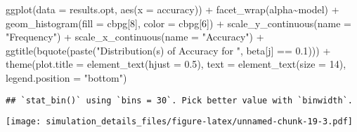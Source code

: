 \documentclass[
]{article}
\newenvironment{Shaded}{\begin{snugshade}}{\end{snugshade}}
\newcommand{\AttributeTok}[1]{\textcolor[rgb]{0.77,0.63,0.00}{#1}}
\newcommand{\DecValTok}[1]{\textcolor[rgb]{0.00,0.00,0.81}{#1}}
\newcommand{\FloatTok}[1]{\textcolor[rgb]{0.00,0.00,0.81}{#1}}
\newcommand{\FunctionTok}[1]{\textcolor[rgb]{0.00,0.00,0.00}{#1}}
\newcommand{\NormalTok}[1]{#1}
\newcommand{\SpecialCharTok}[1]{\textcolor[rgb]{0.00,0.00,0.00}{#1}}
\newcommand{\StringTok}[1]{\textcolor[rgb]{0.31,0.60,0.02}{#1}}
\begin{document}
\begin{Shaded}
\begin{Highlighting}[]
\FunctionTok{ggplot}\NormalTok{(}\AttributeTok{data =}\NormalTok{ results.opt,}
       \FunctionTok{aes}\NormalTok{(}\AttributeTok{x =}\NormalTok{ accuracy)) }\SpecialCharTok{+}
  \FunctionTok{facet\_wrap}\NormalTok{(alpha}\SpecialCharTok{\textasciitilde{}}\NormalTok{model) }\SpecialCharTok{+}
  \FunctionTok{geom\_histogram}\NormalTok{(}\AttributeTok{fill =}\NormalTok{ cbpg[}\DecValTok{8}\NormalTok{], }\AttributeTok{color =}\NormalTok{ cbpg[}\DecValTok{6}\NormalTok{]) }\SpecialCharTok{+}
  \FunctionTok{scale\_y\_continuous}\NormalTok{(}\AttributeTok{name =} \StringTok{"Frequency"}\NormalTok{) }\SpecialCharTok{+}
  \FunctionTok{scale\_x\_continuous}\NormalTok{(}\AttributeTok{name =} \StringTok{"Accuracy"}\NormalTok{) }\SpecialCharTok{+}
  \FunctionTok{ggtitle}\NormalTok{(}\FunctionTok{bquote}\NormalTok{(}\FunctionTok{paste}\NormalTok{(}\StringTok{"Distribution(s) of Accuracy for "}\NormalTok{, beta[j] }\SpecialCharTok{==} \FloatTok{0.1}\NormalTok{))) }\SpecialCharTok{+}
  \FunctionTok{theme}\NormalTok{(}\AttributeTok{plot.title =} \FunctionTok{element\_text}\NormalTok{(}\AttributeTok{hjust =} \FloatTok{0.5}\NormalTok{), }
        \AttributeTok{text =} \FunctionTok{element\_text}\NormalTok{(}\AttributeTok{size =} \DecValTok{14}\NormalTok{),}
        \AttributeTok{legend.position =} \StringTok{"bottom"}\NormalTok{)}
\end{Highlighting}
\end{Shaded}

\begin{verbatim}
## `stat_bin()` using `bins = 30`. Pick better value with `binwidth`.
\end{verbatim}

\texttt{[image: simulation\_details\_files/figure-latex/unnamed-chunk-19-3.pdf]}
\end{document}
